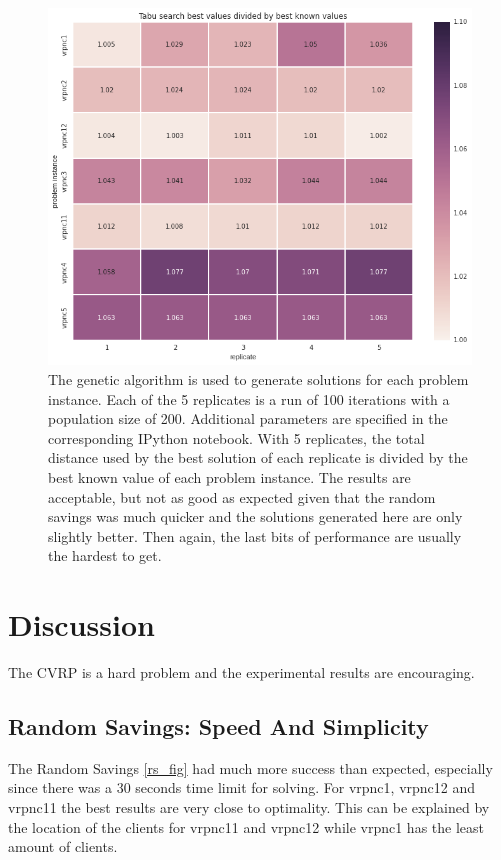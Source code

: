 \documentclass{article} %
\begin{document}
\begin{figure}[!htb]
\begin{center}
 \includegraphics[scale=0.45]{figures/tabu_search}
 \caption{\small  The genetic algorithm is used to generate solutions for each problem instance. Each of the 5 replicates is a run of 100 iterations with a population size of 200. Additional parameters are specified in the corresponding IPython notebook. With 5 replicates, the total distance used by the best solution of each replicate is divided by the best known value of each problem instance. The results are acceptable, but not as good as expected given that the random savings was much quicker and the solutions generated here are only slightly better. Then again, the last bits of performance are usually the hardest to get.}
 \label{ts_fig}
 \end{center}
\end{figure}


\section{Discussion}
\label{analysis_results}

The CVRP is a hard problem and the experimental results are encouraging.\newline

\subsection{Random Savings: Speed And Simplicity}
The Random Savings \ref{rs_fig} had much more success than expected, especially since there was a 30 seconds time limit for solving. For vrpnc1, vrpnc12 and vrpnc11 the best results are very close to optimality. This can be explained by the location of the clients for vrpnc11 and vrpnc12 while vrpnc1 has the least amount of clients.\newline
\end{document}
